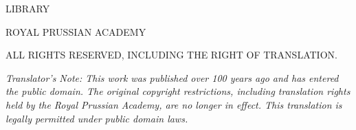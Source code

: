 \vspace*{0.5\textheight}

\begin{center}

{\fontsize{14}{18}\selectfont LIBRARY}

{\fontsize{14}{18}\selectfont ROYAL PRUSSIAN ACADEMY}

\vfill
{\fontsize{10}{14}\selectfont ALL RIGHTS RESERVED, INCLUDING THE RIGHT OF TRANSLATION.}

\vspace{1cm}
{\fontsize{10}{14}\selectfont \textit{Translator's Note: This work was published over 100 years ago and has entered the public domain. The original copyright restrictions, including translation rights held by the Royal Prussian Academy, are no longer in effect. This translation is legally permitted under public domain laws.}}
\end{center}
